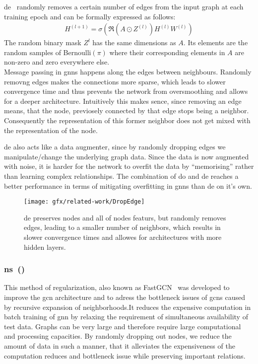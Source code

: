 \ac{de}~\cite{Rong2020} randomly removes a certain number of edges from the input graph at each training epoch and can be formally expressed as follows:
\begin{align*}
    H^{(l+1)} = \sigma(\mathfrak{R}(A \odot Z^{(l)}) H^{(l)} W^{(l)})
\end{align*}
The random binary mask $Z^{l}$ has the same dimensions as $A$.
Its elements are the random samples of Bernoulli$(\pi)$ where their
corresponding elements in $A$ are non-zero and zero everywhere else. \\
Message passing in \acp{gnn} happens along the edges between neighbours.
Randomly removng edges makes the connections more sparse, which
leads to slower convergence time and thus prevents the
network from oversmoothing and allows for a deeper architecture.
Intuitively this makes sence, since removing an edge means, that the node, previosely connected by that edge stops being a neighbor. Consequently the representation of this former neighbor does not get mixed with the representation of the node.

\Ac{de} also acts like a data augmenter, since by randomly dropping edges we manipulate/change the underlying graph data. Since the data is now augmented with noise, it is harder for the network to overfit the data by ``memorising'' rather than learning complex relationships.
The combination of \ac{do} and \ac{de} reaches a better performance in
terms of mitigating overfitting in \acp{gnn} than \ac{de} on it's own.

\begin{figure}[ht]
    \centering
    \texttt{[image: gfx/related-work/DropEdge]}
    \caption{\acf{de} preserves nodes and all of nodes featurs, but randomly removes
        edges, leading to a smaller number of neighbors, which results in slower convergence times and allowes for architectures with more hidden layers.}\label{fig:related:DropEdge}
\end{figure}
\subsubsection{\acl*{ns}~(\citeauthor{Chen2018})}
\label{sec:related:pred:regularization:ns}
This method of regularization, also known as FastGCN~\cite{Chen2018} was
developed to improve the \ac{gcn} \cite{Kipf2017} architecture and to adress the bottleneck issues of \acp{gcn} caused by recursive expansion of neighborhoods.It reduces the expensive computation in batch training of \ac{gnn} by relaxing the requirement of simultaneous availability of test data. Graphs can be very large and therefore require large computational and processing capacities. By randomly dropping out nodes, we reduce the amount of data in such a manner, that it alleviates the expensiveness of the computation reduces and bottleneck issue while preserving important relations.

